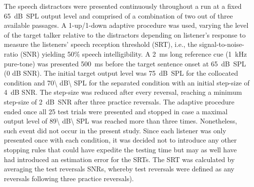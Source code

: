 \documentclass[a4paper, twoside]{templates/ociamthesis}
\begin{document}
The speech distractors were presented continuously throughout a run at a fixed 65~dB~SPL output level and comprised of a combination of two out of three available passages. A 1-up/1-down adaptive procedure was used, varying the level of the target talker relative to the distractors depending on listener's response to measure the listeners' speech reception threshold (SRT), i.e., the signal-to-noise-ratio (SNR) yielding 50\% speech intelligibility. A 2~ms long reference cue (1~kHz pure-tone) was presented 500~ms before the target sentence onset at 65~dB~SPL (0 dB SNR). The initial target output level was 75~dB~SPL for the collocated condition and 70\textbackslash{} dB\textbackslash{} SPL for the separated condition with an initial step-size of 4~dB SNR. The step-size was reduced after every reversal, reaching a minimum step-size of 2~dB~SNR after three practice reversals. The adaptive procedure ended once all 25 test trials were presented and stopped in case a maximal output level of 89\textbackslash{} dB\textbackslash{} SPL was reached more than three times. Nonetheless, such event did not occur in the present study. Since each listener was only presented once with each condition, it was decided not to introduce any other stopping rules that could have expedite the testing time but may as well have had introduced an estimation error for the SRTs. The SRT was calculated by averaging the test reversals SNRs, whereby test reversals were defined as any reversals following three practice reversals).
\end{document}
